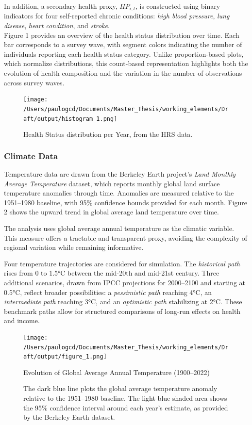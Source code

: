 \documentclass{article}
\begin{document}
In addition, a secondary health proxy, $HP_{i,t}$, is constructed using
binary indicators for four self-reported chronic conditions: \textit{high blood pressure},
\textit{lung disease}, \textit{heart condition}, and \textit{stroke}.
\\ 

Figure 1 provides an overview of the health status distribution over time.
Each bar corresponds to a survey wave, with segment colors indicating the number of individuals reporting each health status category.
Unlike proportion-based plots, which normalize distributions, this count-based representation highlights both the evolution of health composition and the variation in the number of observations across survey waves.


\begin{figure}[H]
    \texttt{[image: /Users/paulogcd/Documents/Master\_Thesis/working\_elements/Draft/output/histogram\_1.png]}
    \caption{Health Status distribution per Year, from the HRS data.}
\end{figure}

\subsubsection{Climate Data}

Temperature data are drawn from the Berkeley Earth project’s \textit{Land Monthly Average Temperature} dataset, which reports monthly global land surface temperature anomalies through time.
Anomalies are measured relative to the 1951–1980 baseline, with 95\% confidence bounds provided for each month.
Figure 2 shows the upward trend in global average land temperature over time.

The analysis uses global average annual temperature as the climatic variable.
This measure offers a tractable and transparent proxy, avoiding the complexity of regional variation while remaining informative.

Four temperature trajectories are considered for simulation.
The \textit{historical path} rises from 0 to 1.5°C between the mid-20th and mid-21st century. Three additional scenarios, drawn from IPCC projections for 2000–2100 and starting at 0.5°C, reflect broader possibilities: a \textit{pessimistic path} reaching 4°C, an \textit{intermediate path} reaching 3°C, and an \textit{optimistic path} stabilizing at 2°C.
These benchmark paths allow for structured comparisons of long-run effects on health and income.

\begin{figure}[H]
    \centering
    \texttt{[image: /Users/paulogcd/Documents/Master\_Thesis/working\_elements/Draft/output/figure\_1.png]}
    \caption{Evolution of Global Average Annual Temperature (1900–2022)}
    \caption*{\small The dark blue line plots the global average temperature anomaly relative to the 1951–1980 baseline.
    The light blue shaded area shows the 95\% confidence interval around each year’s estimate, as provided by the Berkeley Earth dataset.}
\end{figure}
\end{document}
